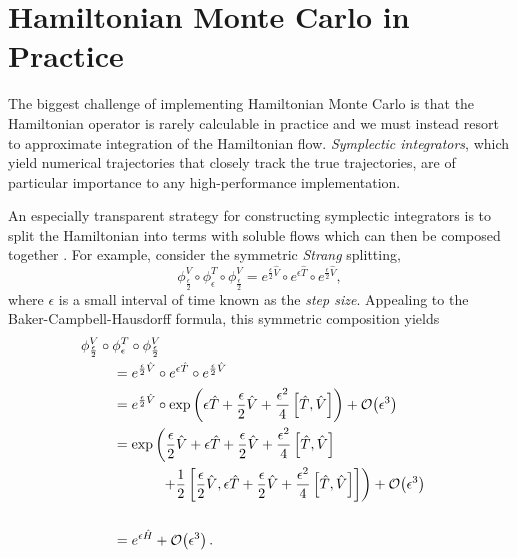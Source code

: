 \documentclass{article}
\begin{document}
\section{Hamiltonian Monte Carlo in Practice}

The biggest challenge of implementing Hamiltonian Monte Carlo is that the
Hamiltonian operator is rarely calculable in practice and we must instead resort 
to approximate integration of the Hamiltonian flow.  \textit{Symplectic integrators}, 
which yield numerical trajectories that closely track the true trajectories, are  
of particular importance to any high-performance implementation. 

An especially transparent strategy for constructing symplectic integrators is to split 
the Hamiltonian into terms with soluble flows which can then be composed together
\cite{LeimkuhlerEtAl:2004, HairerEtAl:2006}.  For example, consider the symmetric 
\textit{Strang} splitting,
%
\begin{equation*}
\phi^{V}_{\frac{\epsilon}{2}} \circ 
\phi^{T}_{\epsilon} \circ 
\phi^{V}_{\frac{\epsilon}{2}}
=
e^{\frac{\epsilon}{2} \hat{V} } \circ 
e^{\epsilon \hat{T} } \circ 
e^{\frac{\epsilon}{2} \hat{V} },
\end{equation*}
%
where $\epsilon$ is a small interval of time known as the \textit{step size}.
Appealing to the Baker-Campbell-Hausdorff formula, this symmetric composition yields
%
\begin{align*}
\phi^{V}_{\frac{\epsilon}{2}} \circ 
\phi^{T}_{\epsilon} \circ 
\phi^{V}_{\frac{\epsilon}{2}}
\\
& \hspace{-12mm} =
e^{\frac{\epsilon}{2} \hat{V} } \circ 
e^{\epsilon \hat{T} } \circ 
e^{\frac{\epsilon}{2} \hat{V} }
\\
& \hspace{-12mm} =
e^{\frac{\epsilon}{2} \hat{V} } \circ 
\exp \left( \epsilon \hat{T} + \frac{\epsilon}{2} \hat{V} 
+ \frac{\epsilon^{2}}{4} \left[ \hat{T}, \hat{V} \right] \right)
+ \mathcal{O} \! \left( \epsilon^{3} \right)
\\
& \hspace{-12mm} =
\exp \left( 
\frac{\epsilon}{2} \hat{V} + \epsilon \hat{T} + \frac{\epsilon}{2} \hat{V} 
+ \frac{\epsilon^{2}}{4} \left[ \hat{T}, \hat{V} \right]
\right.
\\
& \hspace{0mm} \left.
+ \frac{1}{2} \left[ \frac{\epsilon}{2} \hat{V}, \epsilon \hat{T} + \frac{\epsilon}{2} \hat{V} 
+ \frac{\epsilon^{2}}{4} \left[ \hat{T}, \hat{V} \right] \right]
\right)
+ \mathcal{O} \! \left( \epsilon^{3} \right)
\\
\\
& \hspace{-12mm} =
e^{ \epsilon \hat{H} }
+ \mathcal{O} \! \left( \epsilon^{3} \right).
\end{align*}
\end{document}
